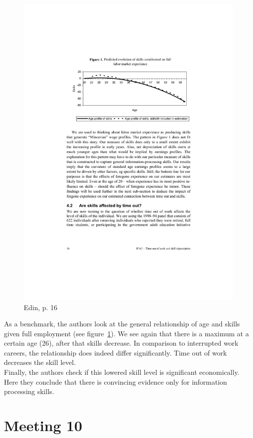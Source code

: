 \documentclass[12pt,a4paper]{article}
\begin{document}
  \begin{figure}[ht]
        \centering
        \includegraphics[width=12cm]{edin_age.pdf}
        \caption{Edin, p. 16}
        \label{edin_age}
  \end{figure}

  As a benchmark, the authors look at the general relationship of age and skills given full employment (see figure~\ref{edin_age}).
  We see again that there is a maximum at a certain age (26), after that skills decrease. In comparison to interrupted work
  careers, the relationship does indeed differ significantly. Time out of work decreases the skill level.\\
  Finally, the authors check if this lowered skill level is significant economically. Here they conclude that there is convincing
  evidence only for information processing skills.


    \section{Meeting 10} %
  \label{sec:Meeting 10}
\end{document}

